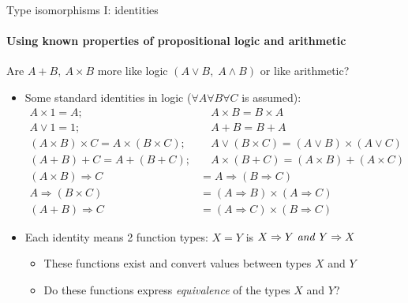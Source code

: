 \documentclass[english]{beamer}
\begin{document}
\begin{frame}{Type isomorphisms I: identities}


\framesubtitle{Using known properties of propositional logic and arithmetic}

Are $A+B,\:A\times B$ more like logic $\left(A\vee B,\;A\wedge B\right)$
or like arithmetic?
\begin{itemize}
\item Some standard identities in logic ($\forall A\forall B\forall C$
is assumed):
\begin{align*}
A\times1=A; & \quad A\times B=B\times A\\
A\vee1=1; & \quad A+B=B+A\\
(A\times B)\times C=A\times(B\times C); & \quad A\vee(B\times C)=(A\vee B)\times(A\vee C)\\
(A+B)+C=A+(B+C); & \quad A\times(B+C)=(A\times B)+(A\times C)\\
(A\times B)\Rightarrow C & =A\Rightarrow(B\Rightarrow C)\\
A\Rightarrow(B\times C) & =(A\Rightarrow B)\times(A\Rightarrow C)\\
(A+B)\Rightarrow C & =(A\Rightarrow C)\times(B\Rightarrow C)
\end{align*}
\item Each identity means 2 function types: $X=Y$ is $X\Rightarrow Y\text{ \emph{and} }Y\Rightarrow X$ 
\begin{itemize}
\item These functions exist and convert values between types $X$ and $Y$
\item Do these functions express \emph{equivalence} of the types $X$ and
$Y$?
\end{itemize}
\end{itemize}
\end{frame}
\end{document}
